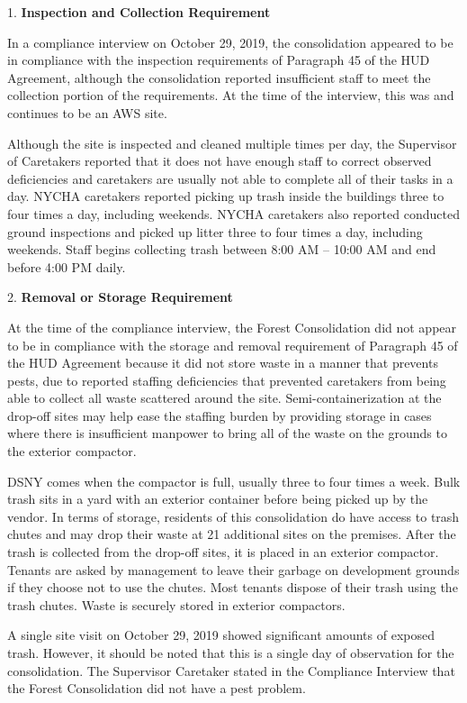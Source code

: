  

1.     \textbf{Inspection and Collection Requirement} 

In a compliance interview on October 29, 2019, the consolidation appeared to be in compliance with the inspection requirements of Paragraph 45 of the HUD Agreement, although the consolidation reported insufficient staff to meet the collection portion of the requirements. At the time of the interview, this was and continues to be an AWS site.  

Although the site is inspected and cleaned multiple times per day, the Supervisor of Caretakers reported that it does not have enough staff to correct observed deficiencies and caretakers are usually not able to complete all of their tasks in a day. NYCHA caretakers reported picking up trash inside the buildings three to four times a day, including weekends. NYCHA caretakers also reported conducted ground inspections and picked up litter three to four times a day, including weekends. Staff begins collecting trash between 8:00 AM -- 10:00 AM and end before 4:00 PM daily.  

 

2.     \textbf{Removal or Storage Requirement} 

At the time of the compliance interview, the Forest Consolidation did not appear to be in compliance with the storage and removal requirement of Paragraph 45 of the HUD Agreement because it did not store waste in a manner that prevents pests, due to reported staffing deficiencies that prevented caretakers from being able to collect all waste scattered around the site.  Semi-containerization at the drop-off sites may help ease the staffing burden by providing storage in cases where there is insufficient manpower to bring all of the waste on the grounds to the exterior compactor. 

DSNY comes when the compactor is full, usually three to four times a week. Bulk trash sits in a yard with an exterior container before being picked up by the vendor. In terms of storage, residents of this consolidation do have access to trash chutes and may drop their waste at 21 additional sites on the premises.  After the trash is collected from the drop-off sites, it is placed in an exterior compactor. Tenants are asked by management to leave their garbage on development grounds if they choose not to use the chutes. Most tenants dispose of their trash using the trash chutes. Waste is securely stored in exterior compactors.  

A single site visit on October 29, 2019 showed significant amounts of exposed trash.  However, it should be noted that this is a single day of observation for the consolidation. The Supervisor Caretaker stated in the Compliance Interview that the Forest Consolidation did not have a pest problem.  

